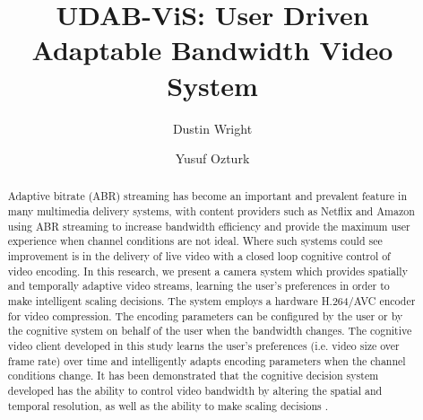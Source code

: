 \documentclass[3p,times,procedia]{elsarticle}
\begin{document}
\begin{frontmatter}




\title{UDAB-ViS: User Driven Adaptable Bandwidth Video System}


\author{Dustin Wright}
\address{San Diego State University, Electrical and Computer Engineering Department, 5500 Campanile Dr. San Diego, California 92182}
\author{Yusuf Ozturk}
\address{San Diego State University, Electrical and Computer Engineering Department, 5500 Campanile Dr. San Diego, California 92182}

\begin{abstract}
Adaptive bitrate (ABR) streaming has become an important and prevalent feature in many multimedia delivery systems, with content providers such as Netflix and Amazon using ABR streaming to increase bandwidth efficiency and provide the maximum user experience when channel conditions are not ideal. Where such systems could see improvement is in the delivery of live video with a closed loop cognitive control of video encoding. In this research, we present a camera system which provides spatially and temporally adaptive video streams, learning the user’s preferences in order to make intelligent scaling decisions. The system employs a hardware H.264/AVC encoder for video compression. The encoding parameters can be configured by the user or by the cognitive system on behalf of the user when the bandwidth changes. The cognitive video client  developed in this study learns the user’s preferences (i.e. video size over frame rate) over time and intelligently adapts  encoding parameters when the channel conditions change. It has been demonstrated that the cognitive decision system developed has  the ability to control video bandwidth by altering the spatial and temporal resolution, as well as the ability to make scaling decisions .
\end{abstract}


\end{frontmatter}
\end{document}
